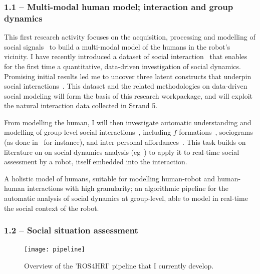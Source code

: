 \subsubsection{1.1 -- Multi-modal human model; interaction and group dynamics}

This first research activity focuses on the acquisition, processing and modelling of social
signals~\parencite{gunes2017automatic} to build a multi-modal model of the humans
in the robot's vicinity. I have recently introduced a dataset of social
interaction~\parencite{lemaignan2018pinsoro} that enables for the first time a
quantitative, data-driven investigation of social dynamics. Promising initial
results led me to uncover three latent constructs that underpin social
interactions~\parencite{bartlett2019what}. This dataset and the related methodologies
on data-driven social modeling will form the basis of this research workpackage,
and will exploit the natural interaction data collected in Strand 5.


From modelling the human, I will then investigate automatic understanding and
modelling of group-level social interactions~\parencite{tapus2019perceiving},
including $f$-formations~\parencite{marshall2011using}, sociograms (as done
in~\parencite{garcia2016hybrid} for instance), and inter-personal
affordances~\parencite{pandey2013affordance}. This task builds on literature on
on social dynamics analysis
(eg~\parencite{durantin2017social,jermann2009physical, martinez2019collocated})
to apply it to real-time social assessment by a robot, itself embedded into the
interaction.

\begin{outcome}{1.1}
    A holistic model of humans, suitable for modelling human-robot and
    human-human interactions with high granularity; an algorithmic pipeline for
    the automatic analysis of social dynamics at group-level, able to model in
    real-time the social context of the robot.
\end{outcome}


\subsubsection{1.2 -- Social situation assessment}

\begin{figure}
    \centering
    \texttt{[image: pipeline]}
    \caption{Overview of the 'ROS4HRI' pipeline that I currently develop.}
    \label{fig:ros4hri}
\end{figure}

